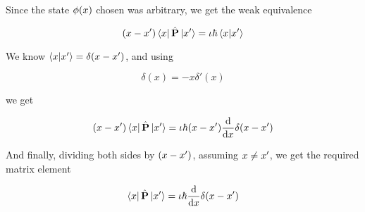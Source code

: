 Since the state $\phi(x)$ chosen was arbitrary,
we get the weak equivalence

\begin{equation}
    (x - x')\bra{x}\hat{\textbf{P}}\ket{x'} =
    \iota \hbar \braket{x}{x'}
\end{equation}

We know $\braket{x}{x'} = \delta(x - x')$, and using

\begin{equation}
    \delta(x) = -x\delta'(x)
    \nonumber
\end{equation}

we get

\begin{equation}
    (x - x')\bra{x}\hat{\textbf{P}}\ket{x'} =
    \iota \hbar (x - x') \dv{}{x}
    \delta(x - x')
\end{equation}

And finally, dividing both sides by $(x - x')$, assuming
$x \not = x'$, we get the required matrix element

\begin{equation}
    \bra{x}\hat{\textbf{P}}\ket{x'} =
    \iota \hbar \dv{}{x}\delta(x - x')
\end{equation}

\begin{flushright}
    \qedsymbol
\end{flushright}

